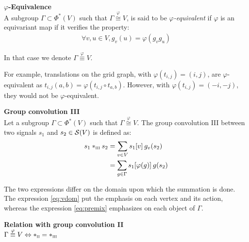 \begin{definition}\textbf{$\varphi$-Equivalence}\\
A subgroup $\Gamma \subset \Phi^*(V)$ such that $\Gamma \overset{\varphi}{\cong} V$, is said to be \emph{$\varphi$-equivalent} if $\varphi$ is an equivariant map \ie if it verifies the property:
\begin{gather*}
\forall v, u \in V, g_v(u) = \varphi(g_vg_u) \tag{P}\label{eq:P}
\end{gather*}
\end{definition}

In that case we denote $\Gamma \overset{\varphi}{\equiv} V$.

\begin{remark}
For example, translations on the grid graph, with $\varphi(t_{i,j}) = (i,j)$, are $\varphi$-equivalent as $t_{i,j}(a,b) = \varphi(t_{i,j} \circ t_{a,b})$. However, with $\varphi(t_{i,j}) = (-i,-j)$, they would not be $\varphi$-equivalent.
\end{remark}

\begin{definition}\textbf{Group convolution III}\\
Let a subgroup $\Gamma \subset \Phi^*(V)$ such that $\Gamma \overset{\varphi}{\cong} V$.
The group convolution III between two signals $s_1$ and $s_2 \in \cs(V)$ is defined as:
\begin{align}
s_1 \ast_{\III} s_2 & = \displaystyle \sum_{v \in V} s_1[v] \h{2} g_v(s_2)\label{eq:vdom}\\
& = \displaystyle \sum_{g \in \Gamma} s_1[\varphi(g)] \h{2} g(s_2) \label{eq:premix}
\end{align}
\label{def:conv3}
\end{definition}

The two expressions differ on the domain upon which the summation is done. The expression \eqref{eq:vdom} put the emphasis on each vertex and its action, whereas the expression \eqref{eq:premix} emphasizes on each object of $\Gamma$.

\begin{lemma}\textbf{Relation with group convolution II}\\
$\Gamma \overset{\varphi}{\equiv} V \Leftrightarrow \ast_{\II} = \ast_{\III}$
\label{lem:rel23}
\end{lemma}

